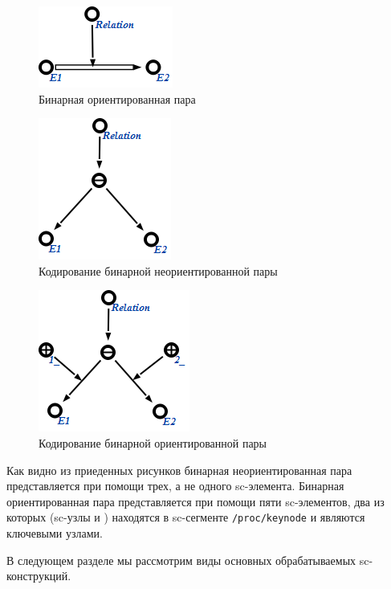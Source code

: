 \begin{figure}[h]
  \centering
  \includegraphics{images/4/scg2sc/Binary_orient_pair}
  \caption{Бинарная ориентированная пара}
  \label{fig:Binary_orient_pair}
\end{figure}

\begin{figure}[h]
  \centering
  \includegraphics{images/4/scg2sc/Unpack_binary_unorient_pair}
  \caption{Кодирование бинарной неориентированной пары}
  \label{fig:Unpack_binary_unorient_pair}
\end{figure}

\begin{figure}[h]
  \centering
  \includegraphics{images/4/scg2sc/Unpack_binary_orient_pair}
  \caption{Кодирование бинарной ориентированной пары}
  \label{fig:Unpack_binary_orient_pair}
\end{figure}

Как видно из приеденных рисунков бинарная неориентированная пара
представляется при помощи трех, а не одного sc-элемента. Бинарная
ориентированная пара представляется при помощи пяти sc-элементов, два
из которых (sc-узлы  и ) находятся в sc-сегменте
\verb|/proc/keynode| и являются ключевыми узлами.

В следующем разделе мы рассмотрим виды основных обрабатываемых
sc-конструкций.

